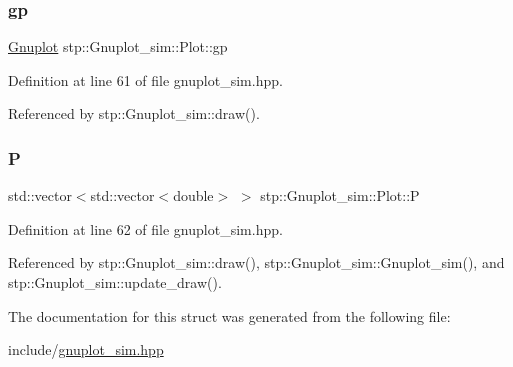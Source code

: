 \subsubsection{\texorpdfstring{gp}{gp}}
{\footnotesize\ttfamily \hyperlink{classgnuplotio_1_1_gnuplot}{Gnuplot} stp\+::\+Gnuplot\+\_\+sim\+::\+Plot\+::gp}



Definition at line 61 of file gnuplot\+\_\+sim.\+hpp.



Referenced by stp\+::\+Gnuplot\+\_\+sim\+::draw().

\mbox{\label{structstp_1_1_gnuplot__sim_1_1_plot_acb7e4715a9d62a66ce7b1228e46fc75d}} 
\subsubsection{\texorpdfstring{P}{P}}
{\footnotesize\ttfamily std\+::vector$<$std\+::vector$<$double$>$ $>$ stp\+::\+Gnuplot\+\_\+sim\+::\+Plot\+::P}



Definition at line 62 of file gnuplot\+\_\+sim.\+hpp.



Referenced by stp\+::\+Gnuplot\+\_\+sim\+::draw(), stp\+::\+Gnuplot\+\_\+sim\+::\+Gnuplot\+\_\+sim(), and stp\+::\+Gnuplot\+\_\+sim\+::update\+\_\+draw().



The documentation for this struct was generated from the following file\+:\begin{DoxyCompactItemize}
\item 
include/\hyperlink{gnuplot__sim_8hpp}{gnuplot\+\_\+sim.\+hpp}\end{DoxyCompactItemize}
